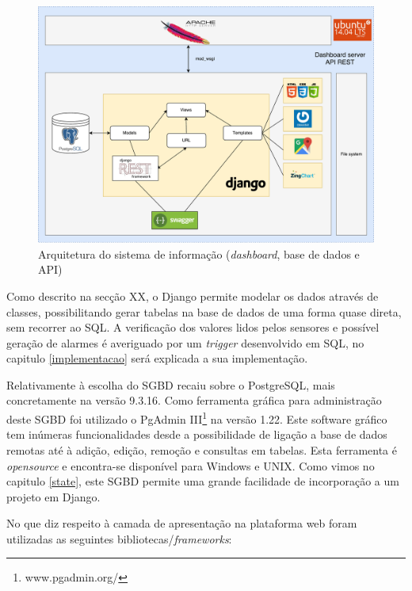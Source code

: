 \newpage
\begin{figure}[h]
	\centering
	\includegraphics[width=\linewidth]{esquemas/fisica-si.pdf}
	\caption{Arquitetura do sistema de informação (\textit{dashboard}, base de dados e API)}
	\label{arquiteturasi}
\end{figure}




Como descrito na secção XX, o Django permite modelar os dados através de classes, possibilitando gerar tabelas na base de dados de uma forma quase direta, sem recorrer ao \ac{SQL}. A verificação dos valores lidos pelos sensores e possível geração de alarmes é averiguado por um \textit{trigger} desenvolvido em \ac{SQL}, no capitulo \ref{implementacao} será explicada a sua implementação.  


Relativamente à escolha do \ac{SGBD} recaiu sobre o PostgreSQL, mais concretamente na versão 9.3.16. Como ferramenta gráfica para administração deste \ac{SGBD} foi utilizado o PgAdmin III\footnote{www.pgadmin.org/} na versão 1.22. Este software gráfico tem inúmeras funcionalidades desde a possibilidade de ligação a base de dados remotas até à adição, edição, remoção e  consultas em tabelas. Esta ferramenta é \textit{opensource} e encontra-se disponível para Windows e UNIX. Como vimos no capitulo \ref{state}, este \ac{SGBD} permite uma grande facilidade de incorporação a um projeto em Django. 


No que diz respeito à camada de apresentação na plataforma web foram utilizadas as seguintes bibliotecas/\textit{frameworks}: 

